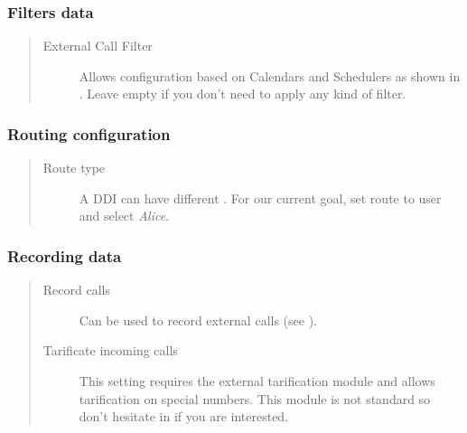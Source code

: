 \documentclass[letterpaper,10pt,spanish]{sphinxmanual}
\begin{document}
\subsubsection{Filters data}
\label{administration_portal/client/vpbx/ddis:filters-data}\begin{quote}
\begin{description}
\item[{External Call Filter}] \leavevmode
Allows configuration based on Calendars and Schedulers as shown in
{\hyperref[administration_portal/client/vpbx/routing_tools/external_call_filters:external\string-call\string-filters]{}}. Leave empty if you don't need to apply any
kind of filter.

\end{description}
\end{quote}


\subsubsection{Routing configuration}
\label{administration_portal/client/vpbx/ddis:routing-configuration}\begin{quote}
\begin{description}
\item[{Route type}] \leavevmode
A DDI can have different {\hyperref[administration_portal/client/vpbx/ddis:routing\string-logics]{}}. For our
current goal, set route to user and select \emph{Alice}.

\end{description}
\end{quote}


\subsubsection{Recording data}
\label{administration_portal/client/vpbx/ddis:recording-data}\begin{quote}
\begin{description}
\item[{Record calls}] \leavevmode
Can be used to record external calls (see {\hyperref[administration_portal/client/vpbx/calls/call_recordings:call\string-recordings]{}}).

\item[{Tarificate incoming calls}] \leavevmode
This setting requires the external tarification module and allows
tarification on special numbers. This module is not standard so don't
hesitate in {\hyperref[basic_concepts/intro/getting_help:getting\string-help]{}} if you are interested.

\end{description}
\end{quote}
\end{document}
